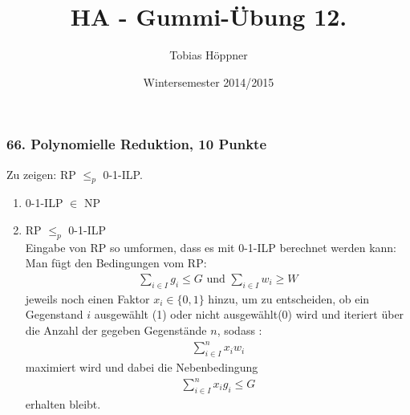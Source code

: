 \documentclass[ngerman,a4paper]{report}
\author{Tobias Höppner}
\title{HA - Gummi-Übung 12.}
\date{Wintersemester 2014/2015}
\renewcommand{\maketitle}{}
\begin{document}
 
\maketitle 

\subsubsection*{66. Polynomielle Reduktion, 10 Punkte}
Zu zeigen: RP $ \leq_p $ 0-1-ILP.
\begin{enumerate}
\item 0-1-ILP $\in$ NP
\item RP $ \leq_p $ 0-1-ILP\\
Eingabe von RP so umformen, dass es mit 0-1-ILP berechnet werden kann:\\
Man fügt den Bedingungen vom RP:
\begin{align*}
\sum_{i \in I} g_i \leq G \text{ und } \sum_{i \in I} w_i \geq W
\end{align*}
jeweils noch einen Faktor $x_i \in \{0,1\}$ hinzu, um zu entscheiden, ob ein Gegenstand $i$ ausgewählt (1) oder nicht ausgewählt(0) wird und iteriert über die Anzahl der gegeben Gegenstände $n$, sodass :
\begin{align*}
\sum_{i \in I}^n x_iw_i
\end{align*}
maximiert wird und dabei die Nebenbedingung
\begin{align*}
\sum_{i \in I}^n x_ig_i \leq G
\end{align*}
erhalten bleibt.
\end{enumerate} 
\end{document}
